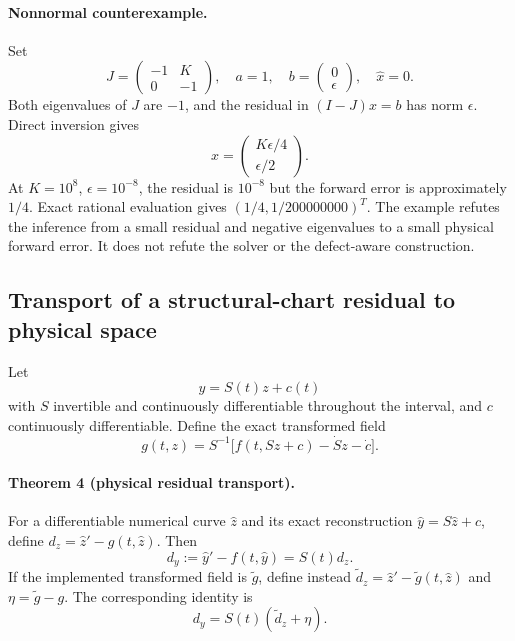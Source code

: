 \paragraph{Nonnormal counterexample.}
Set
\begin{equation}
 J=\begin{pmatrix}-1&K\\0&-1\end{pmatrix},\quad
 a=1,\quad b=\begin{pmatrix}0\\\epsilon\end{pmatrix},\quad
 \widehat x=0.
\end{equation}
Both eigenvalues of $J$ are $-1$, and the residual in
$(I-J)x=b$ has norm $\epsilon$.  Direct inversion gives
\begin{equation}
 x=\begin{pmatrix}K\epsilon/4\\\epsilon/2\end{pmatrix}.
\end{equation}
At $K=10^8$, $\epsilon=10^{-8}$, the residual is $10^{-8}$ but the forward
error is approximately $1/4$.  Exact rational evaluation gives
$(1/4,1/200000000)^T$.  The example refutes the inference from a small
residual and negative eigenvalues to a small physical forward error.  It
does not refute the solver or the defect-aware construction.

\subsection{Transport of a structural-chart residual to physical space}
\label{subsec:chart-theorem}

Let
\begin{equation}
 y=S(t)z+c(t)
\end{equation}
with $S$ invertible and continuously differentiable throughout the interval,
and $c$ continuously differentiable.  Define the exact transformed field
\begin{equation}
 g(t,z)=S^{-1}\bigl[f(t,Sz+c)-\dot S z-\dot c\bigr].
 \label{eq:exact-chart-field}
\end{equation}

\paragraph{Theorem 4 (physical residual transport).}
For a differentiable numerical curve $\widehat z$ and its exact
reconstruction $\widehat y=S\widehat z+c$, define
$d_z=\widehat z'-g(t,\widehat z)$.  Then
\begin{equation}
 d_y:=\widehat y'-f(t,\widehat y)=S(t)d_z.
 \label{eq:chart-residual}
\end{equation}
If the implemented transformed field is $\widetilde g$, define instead
$\widetilde d_z=\widehat z'-\widetilde g(t,\widehat z)$ and
$\eta=\widetilde g-g$.  The corresponding identity is
\begin{equation}
 d_y=S(t)(\widetilde d_z+\eta).
 \label{eq:approximate-chart-residual}
\end{equation}

